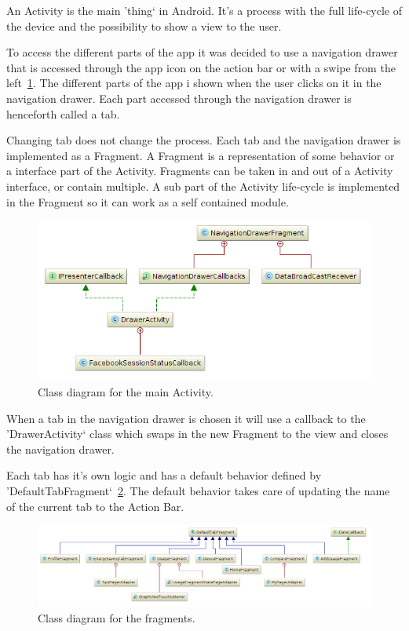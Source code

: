 An Activity is the main 'thing` in Android. It's a process with the full life-cycle of the device and the possibility to show a view to the user.

To access the different parts of the app it was decided to use a navigation drawer that is accessed through the app icon on the action bar or with a swipe from the left~\ref{fig:class_diagram_drawer}. The different parts of the app i shown when the user clicks on it in the navigation drawer. Each part accessed through the navigation drawer is henceforth called a tab. 

Changing tab does not change the process. Each tab and the navigation drawer is implemented as a Fragment. A Fragment is a representation of some behavior or a interface part of the Activity. Fragments can be taken in and out of a Activity interface, or contain multiple. A sub part of the Activity life-cycle is implemented in the Fragment so it can work as a self contained module. 


\begin{figure}[H]
\includegraphics[width=\textwidth]{ch/architecture/fig/class_diagram_drawer.png}
\caption{Class diagram for the main Activity.}
\label{fig:class_diagram_drawer}
\end{figure}

When a tab in the navigation drawer is chosen it will use a callback to the 'DrawerActivity` class which swaps in the new Fragment to the view and closes the navigation drawer.

Each tab has it's own logic and has a default behavior defined by 'DefaultTabFragment`~\ref{fig:class_diagram_fragments}. The default behavior takes care of updating the name of the current tab to the Action Bar.

\begin{figure}[H]
\includegraphics[width=\textwidth]{ch/architecture/fig/class_diagram_fragments.png}
\caption{Class diagram for the fragments.}
\label{fig:class_diagram_fragments}
\end{figure}

